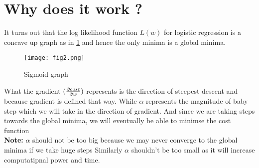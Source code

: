 \documentclass[a4paper, 11pt]{article}
\begin{document}
\section{Why does it work ?} 
It turns out that the log likelihood function $L(w)$ for logistic regression is a concave up graph as in \ref{fig:fig2} and hence the only minima is a global minima.


\begin{figure}[ht!]
    \texttt{[image: fig2.png]}
    \caption{Sigmoid graph}
    \label{fig:fig2}
  \end{figure}

What the gradient $(\diffp{cost}{w})$ represents is the direction of steepest descent and because gradient is defined that way.
While $\alpha$ represents the magnitude of baby step which we will take in the direction of gradient. And since we are taking steps towards the global minima, we will eventually be able to minimse the cost function\\
 \textbf{Note:} $\alpha$ should not be too big because we may never converge to the global minima if we take huge steps
Similarly $\alpha$ shouldn't be too small as it will increase computatipnal power and time.

\pagebreak



\end{document}
